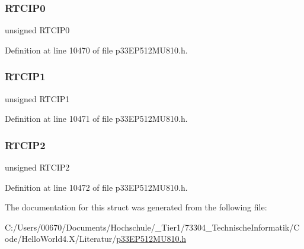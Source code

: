 \subsubsection{\texorpdfstring{R\+T\+C\+I\+P0}{RTCIP0}}
{\footnotesize\ttfamily unsigned R\+T\+C\+I\+P0}



Definition at line 10470 of file p33\+E\+P512\+M\+U810.\+h.

\mbox{\label{structtag_i_p_c15_b_i_t_s_a39518505f4603cd8b09f5ab1f65357b8}} 
\subsubsection{\texorpdfstring{R\+T\+C\+I\+P1}{RTCIP1}}
{\footnotesize\ttfamily unsigned R\+T\+C\+I\+P1}



Definition at line 10471 of file p33\+E\+P512\+M\+U810.\+h.

\mbox{\label{structtag_i_p_c15_b_i_t_s_a610730a802c8959ce1488f5921e2f2e1}} 
\subsubsection{\texorpdfstring{R\+T\+C\+I\+P2}{RTCIP2}}
{\footnotesize\ttfamily unsigned R\+T\+C\+I\+P2}



Definition at line 10472 of file p33\+E\+P512\+M\+U810.\+h.



The documentation for this struct was generated from the following file\+:\begin{DoxyCompactItemize}
\item 
C\+:/\+Users/00670/\+Documents/\+Hochschule/\+\_\+\+Tier1/73304\+\_\+\+Technische\+Informatik/\+Code/\+Hello\+World4.\+X/\+Literatur/\hyperlink{p33_e_p512_m_u810_8h}{p33\+E\+P512\+M\+U810.\+h}\end{DoxyCompactItemize}

